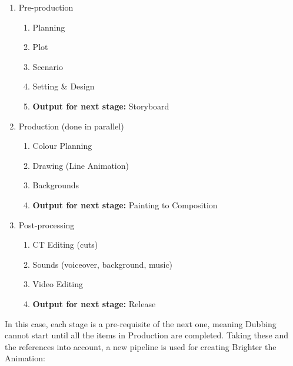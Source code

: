 \begin{enumerate}
    \item Pre-production
        \begin{enumerate}[label*=\arabic*.]
            \item Planning
            \item Plot
            \item Scenario
            \item Setting \& Design
            \item \textbf{Output for next stage:} Storyboard
        \end{enumerate}
    \item Production (done in parallel)
        \begin{enumerate}[label*=\arabic*.]
            \item Colour Planning
            \item Drawing (Line Animation)
            \item Backgrounds
            \item \textbf{Output for next stage:} Painting to Composition
        \end{enumerate}
    \item Post-processing
        \begin{enumerate}[label*=\arabic*.]
            \item CT Editing (cuts)
            \item Sounds (voiceover, background, music)
            \item Video Editing
            \item \textbf{Output for next stage:} Release
        \end{enumerate}
\end{enumerate}

In this case, each stage is a pre-requisite of the next one, meaning Dubbing cannot start until all the items in Production are completed. Taking these and the references into account, a new pipeline is used for creating Brighter the Animation:


